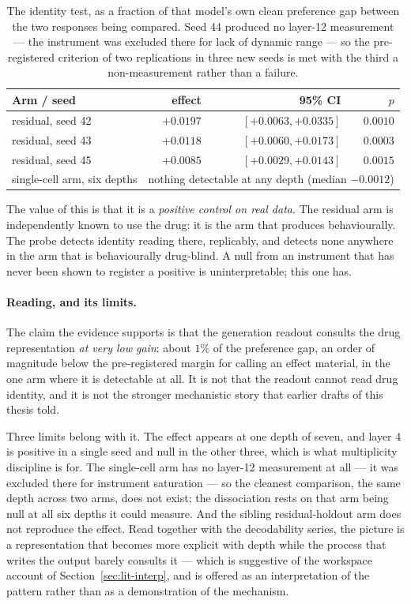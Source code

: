 \begin{table}[h]
\centering
\begin{tabular}{lrrr}
\toprule
Arm / seed & effect & 95\% CI & $p$ \\
\midrule
residual, seed 42 & $+0.0197$ & $[+0.0063, +0.0335]$ & $0.0010$ \\
residual, seed 43 & $+0.0118$ & $[+0.0060, +0.0173]$ & $0.0003$ \\
residual, seed 45 & $+0.0085$ & $[+0.0029, +0.0143]$ & $0.0015$ \\
\midrule
single-cell arm, six depths & \multicolumn{3}{l}{nothing detectable at any depth (median $-0.0012$)} \\
\bottomrule
\end{tabular}
\caption{The identity test, as a fraction of that model's own clean preference gap between the two
responses being compared. Seed 44 produced no layer-12 measurement --- the instrument was excluded
there for lack of dynamic range --- so the pre-registered criterion of two replications in three new
seeds is met with the third a non-measurement rather than a failure.}
\label{tab:identity}
\end{table}

The value of this is that it is a \emph{positive control on real data}. The residual arm is
independently known to use the drug: it is the arm that produces  behaviourally.
The probe detects identity reading there, replicably, and detects none anywhere in the arm that is
behaviourally drug-blind. A null from an instrument that has never been shown to register a positive
is uninterpretable; this one has.

\paragraph{Reading, and its limits.} The claim the evidence supports is that the generation readout
consults the drug representation \emph{at very low gain}: about $1\%$ of the preference gap, an order
of magnitude below the pre-registered margin for calling an effect material, in the one arm where it
is detectable at all. It is not that the readout cannot read drug identity, and it is not the
stronger mechanistic story that earlier drafts of this thesis told.

Three limits belong with it. The effect appears at one depth of seven, and layer 4 is positive in a
single seed and null in the other three, which is what multiplicity discipline is for. The
single-cell arm has no layer-12 measurement at all --- it was excluded there for instrument
saturation --- so the cleanest comparison, the same depth across two arms, does not exist; the
dissociation rests on that arm being null at all six depths it could measure. And the sibling
residual-holdout arm does not reproduce the effect. Read together with the decodability series, the
picture is a representation that becomes more explicit with depth while the process that writes the
output barely consults it --- which is suggestive of the workspace account of
Section~\ref{sec:lit-interp}, and is offered as an interpretation of the pattern rather than as a
demonstration of the mechanism.


